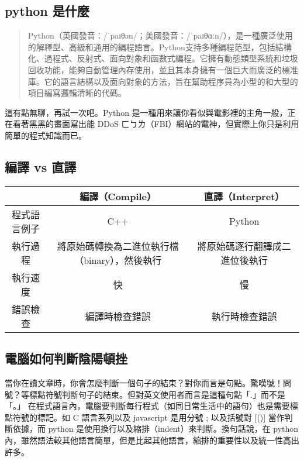 \documentclass{article}
\begin{document}

\begin{large}

\section{python 是什麼}
    \begin{quote}
        Python（英國發音：/ˈpaɪθən/；美國發音：/ˈpaɪθɑːn/），是一種廣泛使用的解釋型、高級和通用的編程語言。Python支持多種編程范型，包括結構化、過程式、反射式、面向對象和函數式編程。它擁有動態類型系統和垃圾回收功能，能夠自動管理內存使用，並且其本身擁有一個巨大而廣泛的標准庫。它的語言結構以及面向對象的方法，旨在幫助程序員為小型的和大型的項目編寫邏輯清晰的代碼。
    \end{quote}
    這有點無聊，再試一次吧。Python 是一種用來讓你看似與電影裡的主角一般，正在看著黑黑的畫面寫出能
    DDoS ㄈㄅㄌ（FBI）網站的電神，但實際上你只是利用簡單的程式知識而已。

    \subsection{編譯 vs 直譯}
    \begin{tabular}{|c|c|c|}
\hline
& 編譯（Compile） & 直譯（Interpret） \\
\hline
程式語言例子 & C++ & Python \\
\hline
        執行過程 & 將原始碼轉換為二進位執行檔（binary），然後執行 &
        將原始碼逐行翻譯成二進位後執行 \\
\hline
執行速度 & 快 & 慢 \\
\hline
錯誤檢查 & 編譯時檢查錯誤 & 執行時檢查錯誤 \\
\hline
\end{tabular}
    \subsection{電腦如何判斷陰陽頓挫}
    當你在讀文章時，你會怎麼判斷一個句子的結束？對你而言是句點。驚嘆號！問號？等標點符號判斷句子的結束。但對英文使用者而言是這種句點「.」而不是「。」
    在程式語言內，電腦要判斷每行程式（如同日常生活中的語句）也是需要標點符號的標記。如 C
    語言系列以及 javascript 是用分號 ; 以及括號對 {[()]} 當作判斷依據，而 python
    是使用換行以及縮排（indent）來判斷。換句話說，在 python
    內，雖然語法較其他語言簡單，但是比起其他語言，縮排的重要性以及統一性高出許多。

\end{large}
\end{document}
